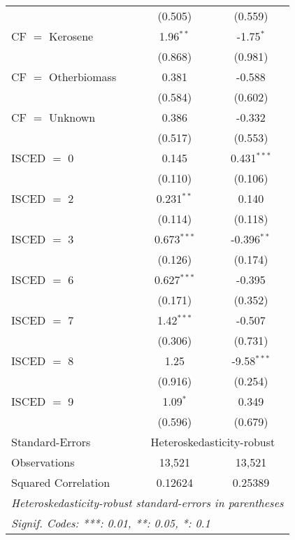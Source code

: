 \begin{table}[htbp!]
\begin{adjustbox}{width = 1\textwidth, max height = 0.95\textheight, center}
\begin{threeparttable}[b]
\begin{tabular}{lcc}
                                 & (0.505)       & (0.559)\\   
            CF $=$ Kerosene      & 1.96$^{**}$   & -1.75$^{*}$\\   
                                 & (0.868)       & (0.981)\\   
            CF $=$ Otherbiomass  & 0.381         & -0.588\\   
                                 & (0.584)       & (0.602)\\   
            CF $=$ Unknown       & 0.386         & -0.332\\   
                                 & (0.517)       & (0.553)\\   
            ISCED $=$ 0          & 0.145         & 0.431$^{***}$\\   
                                 & (0.110)       & (0.106)\\   
            ISCED $=$ 2          & 0.231$^{**}$  & 0.140\\   
                                 & (0.114)       & (0.118)\\   
            ISCED $=$ 3          & 0.673$^{***}$ & -0.396$^{**}$\\   
                                 & (0.126)       & (0.174)\\   
            ISCED $=$ 6          & 0.627$^{***}$ & -0.395\\   
                                 & (0.171)       & (0.352)\\   
            ISCED $=$ 7          & 1.42$^{***}$  & -0.507\\   
                                 & (0.306)       & (0.731)\\   
            ISCED $=$ 8          & 1.25          & -9.58$^{***}$\\   
                                 & (0.916)       & (0.254)\\   
            ISCED $=$ 9          & 1.09$^{*}$    & 0.349\\   
                                 & (0.596)       & (0.679)\\   
            \midrule 
            Standard-Errors & \multicolumn{2}{c}{Heteroskedasticity-robust} \\ 
            Observations         & 13,521        & 13,521\\  
            Squared Correlation  & 0.12624       & 0.25389\\  
            \midrule \midrule
            \multicolumn{3}{l}{\emph{Heteroskedasticity-robust standard-errors in parentheses}}\\
            \multicolumn{3}{l}{\emph{Signif. Codes: ***: 0.01, **: 0.05, *: 0.1}}\\
         \end{tabular}
         

\end{threeparttable}
\end{adjustbox}
\end{table}
